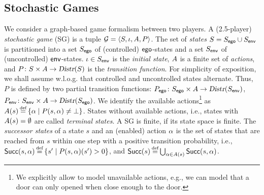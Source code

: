 \subsection{Stochastic Games}
We consider a graph-based game formalism between two players. A
(2.5-player) \emph{stochastic game} (SG) is a tuple $\mathcal{G} = \langle S,
\iota, A, P \rangle$.  The set of \emph{states} $S = S_{\mathsf{ego}} \cup
S_{\mathsf{env}}$ is partitioned into a set $S_{\mathsf{ego}}$ of (controlled)
$\mathsf{ego}$-states and a set $S_{\mathsf{env}}$ of (uncontrolled)
$\mathsf{env}$-states. $\iota \in S_{\mathsf{env}}$ is the \emph{initial state}, $A$ is a
finite set of \emph{actions}, and $P\colon S \times A \rightarrow
\textsl{Distr}(S)$ is the \emph{transition function}. For simplicity of
exposition, we shall assume w.l.o.g. that controlled and uncontrolled
states alternate. Thus, $P$ is defined by two partial transition functions:
$P_{\mathsf{ego}}\colon S_{\mathsf{ego}} \times A \rightarrow \textsl{Distr}(S_{\mathsf{env}})$,
$P_{\mathsf{env}}\colon S_{\mathsf{env}} \times A \rightarrow \textsl{Distr}(S_{\mathsf{ego}})$. We
identify the available actions\footnote{We explicitly allow to model
unavailable actions, e.g., we can model that a door can only opened
when close enough to the door.} as $\EnAct(s) \eqdef \{ \act \mid
P(s,\act) \neq \bot \}$. States without available actions, i.e.,
states with $A(s) = \emptyset$ are called \emph{terminal states}.
A SG is finite, if its state space is finite.  The \emph{successor
states} of a state $s$ and an (enabled) action $\alpha$ is the set of
states that are reached from $s$ within one step with a positive
transition probability, i.e., $\Succ(s,\act) \eqdef \{ s' \mid
P(s,\act)(s')>0 \}$, and $\Succ(s) \eqdef\bigcup_{\act \in \EnAct(s)}
\Succ(s,\act)$.


